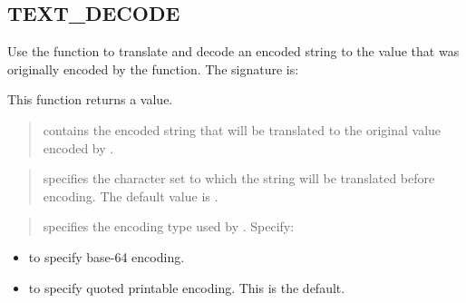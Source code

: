 \documentclass[letterpaper,10pt,english,openany,oneside]{sphinxmanual}
\begin{document}
\newpage


\subsection{TEXT\_DECODE}
\label{\detokenize{text_decode::doc}}\label{\detokenize{text_decode:text-decode}}
Use the  function to translate and decode an encoded string
to the  value that was originally encoded by the 
function. The signature is:
\begin{quote}

\end{quote}

This function returns a  value.


\begin{quote}

 contains the encoded string that will be translated to the
original value encoded by .
\end{quote}

\begin{quote}

 specifies the character set to which the string
will be translated before encoding. The default value is .
\end{quote}

\begin{quote}

 specifies the encoding type used by .
Specify:
\end{quote}
\begin{itemize}
\item {} 
 to specify base-64 encoding.

\item {} 
 to specify quoted printable encoding.
This is the default.

\end{itemize}
\end{document}
